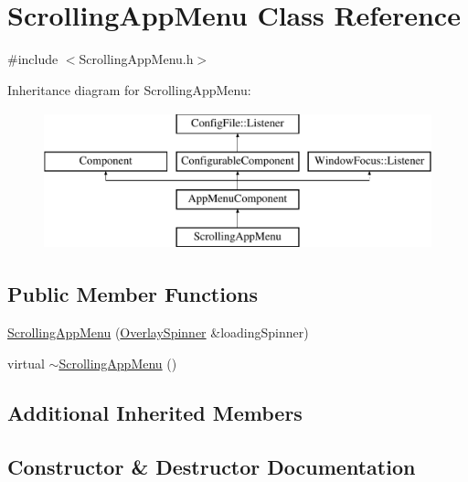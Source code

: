 \hypertarget{classScrollingAppMenu}{}\section{Scrolling\+App\+Menu Class Reference}
\label{classScrollingAppMenu}


{\ttfamily \#include $<$Scrolling\+App\+Menu.\+h$>$}

Inheritance diagram for Scrolling\+App\+Menu\+:\begin{figure}[H]
\begin{center}
\leavevmode
\includegraphics[height=4.000000cm]{classScrollingAppMenu}
\end{center}
\end{figure}
\subsection*{Public Member Functions}
\begin{DoxyCompactItemize}
\item 
\mbox{\hyperlink{classScrollingAppMenu_a284a280531d28b55c79fdf8a53f3bffa}{Scrolling\+App\+Menu}} (\mbox{\hyperlink{classOverlaySpinner}{Overlay\+Spinner}} \&loading\+Spinner)
\item 
virtual \mbox{\hyperlink{classScrollingAppMenu_a1c078885624aa4aba2f8d4f3ffb61876}{$\sim$\+Scrolling\+App\+Menu}} ()
\end{DoxyCompactItemize}
\subsection*{Additional Inherited Members}


\subsection{Constructor \& Destructor Documentation}
\mbox{\label{classScrollingAppMenu_a284a280531d28b55c79fdf8a53f3bffa}} 
